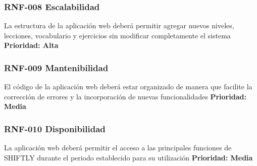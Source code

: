 \subsubsection{RNF-008 Escalabilidad}
La estructura de la aplicación web deberá permitir agregar nuevos niveles,
lecciones, vocabulario y ejercicios sin modificar completamente el sistema
\textbf{Prioridad: Alta}
\subsubsection{RNF-009 Mantenibilidad}
El código de la aplicación web deberá estar organizado de manera que
facilite la corrección de errores y la incorporación de nuevas
funcionalidades
\textbf{Prioridad: Media}
\subsubsection{RNF-010 Disponibilidad}
La aplicación web deberá permitir el acceso a las principales funciones de
SHIFTLY durante el periodo establecido para su utilización
\textbf{Prioridad: Media}
